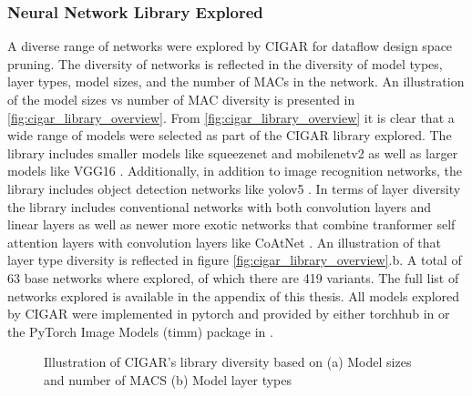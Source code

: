 \subsubsection{Neural Network Library Explored}
\label{chap:dataflow_dse:pruning:cigar:library}

A diverse range of networks were explored by CIGAR for dataflow design space
pruning. The diversity of networks is reflected in the diversity of model types,
layer types, model sizes, and the number of MACs in the network. An illustration
of the model sizes vs number of MAC diversity is presented in
\autoref{fig:cigar_library_overview}. From \autoref{fig:cigar_library_overview}
it is clear that a wide range of models were selected as part of the CIGAR
library explored. The library includes smaller models like squeezenet and
mobilenetv2 as well as larger models like VGG16 \cite{dnn_is_sota_image}.
Additionally, in addition to image recognition networks, the library includes
object detection networks like yolov5 \cite{DBLP:journals/corr/abs-2108-11539}.
In terms of layer diversity the library includes conventional networks with both
convolution layers and linear layers as well as newer more exotic networks that
combine tranformer self attention layers with convolution layers like CoAtNet
\cite{xu_co-scale_2021}. An illustration of that layer type diversity is
reflected in figure \autoref{fig:cigar_library_overview}.b. A total of 63 base networks where explored, of which there
are 419 variants. The full list of networks explored is available in the
appendix of this thesis. All models explored by CIGAR were implemented in
pytorch and provided by either torchhub in \cite{pytorch} or the PyTorch Image
Models (timm) package in \cite{timm}.  

\begin{figure}
    \centering
    \caption{Illustration of CIGAR's library diversity based on (a) Model sizes and number of MACS (b) Model layer types}
    \label{fig:cigar_library_overview}
\end{figure}


